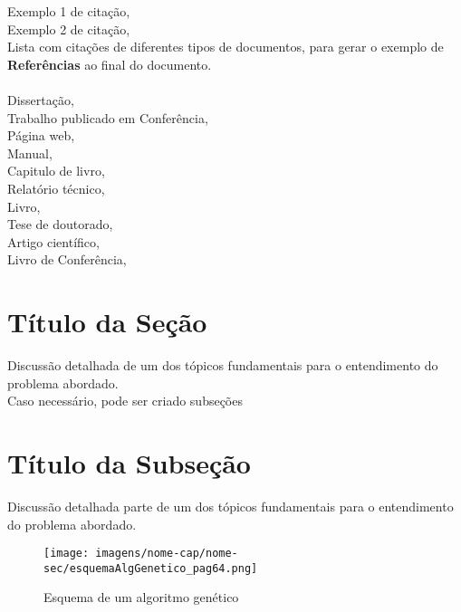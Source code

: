 Exemplo 1 de citação, \cite{almeida2022}\\
Exemplo 2 de citação, \\ 
Lista com citações de  diferentes tipos de documentos, para gerar o exemplo de\\ \textbf{Referências} ao final do documento.\\ \\
Dissertação, \cite{almeida2022}\\
Trabalho publicado em Conferência, \cite{cbsoft2023}\\
Página web, \cite{ferreira2020}\\
Manual, \cite{latex2023}\\
Capitulo de livro, \cite{mendes2019}\\
Relatório técnico, \cite{oliveira2020}\\
Livro, \cite{linden2012}\\
Tese de doutorado, \cite{rodrigues2021}\\
Artigo científico, \cite{silva2023}\\
Livro de Conferência, \cite{souza2022}


\section{Título da Seção} \label{sec:definir-tituto-da-secao}
Discussão detalhada de um dos tópicos fundamentais para o entendimento do problema abordado. \\ Caso necessário, pode ser criado subseções


\section{Título da Subseção} \label{sec:definir-outro-tituto-de-secao}
Discussão detalhada parte de um dos tópicos fundamentais para o entendimento do problema abordado.
\begin{figure} [htb]
    \begin{center}
	 \caption{\label{fig:ag}Esquema de um algoritmo genético}
        \texttt{[image: imagens/nome-cap/nome-sec/esquemaAlgGenetico\_pag64.png]}
    	\end{center}
    \end{figure}
    
